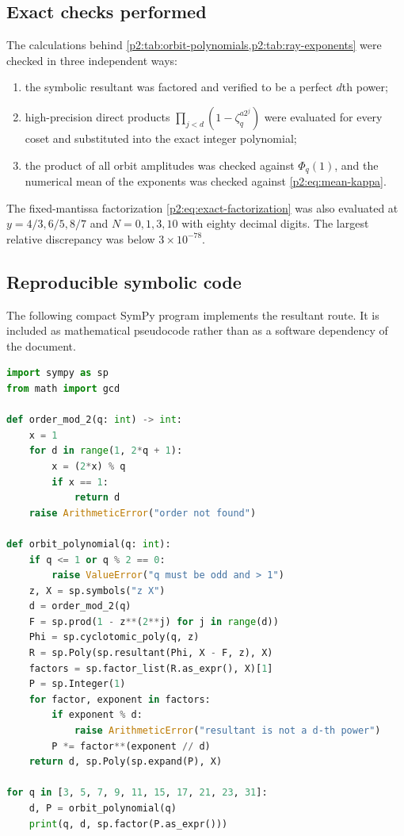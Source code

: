 \documentclass[11pt,oneside]{article}
\theoremstyle{definition}
\theoremstyle{remark}
\begin{document}
\subsection{Exact checks performed}

The calculations behind \cref{p2:tab:orbit-polynomials,p2:tab:ray-exponents} were checked
in three independent ways:
\begin{enumerate}
 \item the symbolic resultant was factored and verified to be a perfect $d$th
 power;
 \item high-precision direct products $\prod_{j<d}(1-\zeta_q^{a2^j})$ were evaluated
 for every coset and substituted into the exact integer polynomial;
 \item the product of all orbit amplitudes was checked against $\Phi_q(1)$, and the
 numerical mean of the exponents was checked against \eqref{p2:eq:mean-kappa}.
\end{enumerate}
The fixed-mantissa factorization \eqref{p2:eq:exact-factorization} was also evaluated
at $y=4/3,6/5,8/7$ and $N=0,1,3,10$ with eighty decimal digits. The largest relative
discrepancy was below $3\times10^{-78}$.

\subsection{Reproducible symbolic code}

The following compact SymPy program implements the resultant route. It is included
as mathematical pseudocode rather than as a software dependency of the document.

\begin{lstlisting}[style=pseudo,language=Python,caption={Orbit-polynomial computation.}]
import sympy as sp
from math import gcd

def order_mod_2(q: int) -> int:
    x = 1
    for d in range(1, 2*q + 1):
        x = (2*x) % q
        if x == 1:
            return d
    raise ArithmeticError("order not found")

def orbit_polynomial(q: int):
    if q <= 1 or q % 2 == 0:
        raise ValueError("q must be odd and > 1")
    z, X = sp.symbols("z X")
    d = order_mod_2(q)
    F = sp.prod(1 - z**(2**j) for j in range(d))
    Phi = sp.cyclotomic_poly(q, z)
    R = sp.Poly(sp.resultant(Phi, X - F, z), X)
    factors = sp.factor_list(R.as_expr(), X)[1]
    P = sp.Integer(1)
    for factor, exponent in factors:
        if exponent % d:
            raise ArithmeticError("resultant is not a d-th power")
        P *= factor**(exponent // d)
    return d, sp.Poly(sp.expand(P), X)

for q in [3, 5, 7, 9, 11, 15, 17, 21, 23, 31]:
    d, P = orbit_polynomial(q)
    print(q, d, sp.factor(P.as_expr()))
\end{lstlisting}
\end{document}
